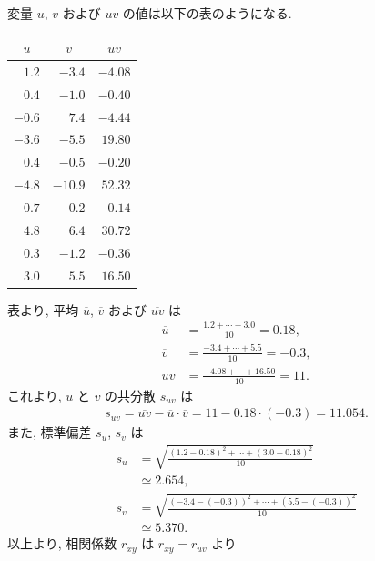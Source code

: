 \vspace{\baselineskip}
\stepup
\begin{qenumerate}
	\item{
		変量 $u$, $v$ および $uv$ の値は以下の表のようになる.
		\begin{table}[H]
			\centering
			\begin{tabular}{r|r|r} \hline
				\multicolumn{1}{c|}{$u$} & \multicolumn{1}{c|}{$v$} & \multicolumn{1}{c}{$uv$} \\ \hline
				$ 1.2$ & $ -3.4$ & $-4.08$ \\
				$ 0.4$ & $ -1.0$ & $-0.40$ \\
				$-0.6$ & $  7.4$ & $-4.44$ \\
				$-3.6$ & $ -5.5$ & $19.80$ \\
				$ 0.4$ & $ -0.5$ & $-0.20$ \\
				$-4.8$ & $-10.9$ & $52.32$ \\
				$ 0.7$ & $  0.2$ & $ 0.14$ \\
				$ 4.8$ & $  6.4$ & $30.72$ \\
				$ 0.3$ & $ -1.2$ & $-0.36$ \\
				$ 3.0$ & $  5.5$ & $16.50$ \\ \hline
			\end{tabular}
		\end{table}
		表より, 平均 $\overline{u}$, $\overline{v}$ および $\overline{uv}$ は
		\begin{align}
			\overline{u} &= \frac{1.2 + \cdots + 3.0}{10} = 0.18, \\
			\overline{v} &= \frac{-3.4 + \cdots + 5.5}{10} = -0.3, \\
			\overline{uv} &= \frac{-4.08 + \cdots + 16.50}{10} = 11.
		\end{align}
		これより, $u$ と $v$ の共分散 $s_{uv}$ は
		\begin{align}
			s_{uv} = \overline{uv} - \overline{u}\cdot \overline{v} = 11 - 0.18\cdot (-0.3) = 11.054.
		\end{align}
		また, 標準偏差 $s_{u}$, $s_{v}$ は
		\begin{align}
			s_{u} &= \sqrt{\frac{(1.2 - 0.18)^{2} + \cdots + (3.0 - 0.18)^{2}}{10}} \\
				&\simeq 2.654, \\
			s_{v} &= \sqrt{\frac{(-3.4 - (-0.3))^{2} + \cdots + (5.5 - (-0.3))^{2}}{10}} \\
				&\simeq 5.370.
		\end{align}
		以上より, 相関係数 $r_{xy}$ は $r_{xy} = r_{uv}$ より
		\begin{align}

\end{align}}
\end{qenumerate}
